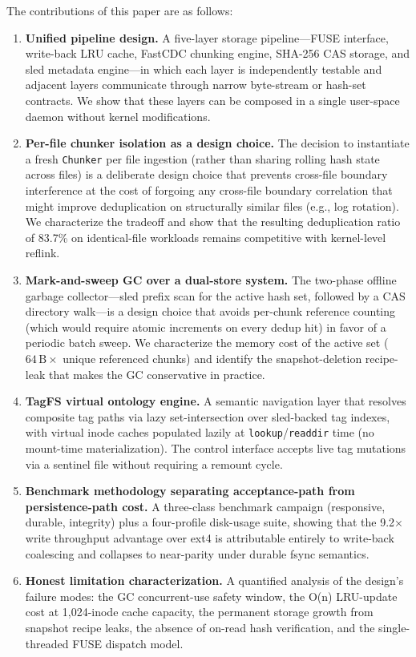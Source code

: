 \documentclass[5p,times]{elsarticle}
\begin{document}
The contributions of this paper are as follows:
\begin{enumerate}
\item \textbf{Unified pipeline design.} A five-layer storage pipeline---FUSE
  interface, write-back LRU cache, FastCDC chunking engine, SHA-256 CAS
  storage, and sled metadata engine---in which each layer is independently
  testable and adjacent layers communicate through narrow byte-stream or
  hash-set contracts.  We show that these layers can be composed in a
  single user-space daemon without kernel modifications.

\item \textbf{Per-file chunker isolation as a design choice.} The
  decision to instantiate a fresh \texttt{Chunker} per file ingestion
  (rather than sharing rolling hash state across files) is a deliberate
  design choice that prevents cross-file boundary interference at the cost
  of forgoing any cross-file boundary correlation that might improve
  deduplication on structurally similar files (e.g., log rotation).
  We characterize the tradeoff and show that the resulting deduplication
  ratio of 83.7\% on identical-file workloads remains competitive with
  kernel-level reflink.

\item \textbf{Mark-and-sweep GC over a dual-store system.} The two-phase
  offline garbage collector---sled prefix scan for the active hash set,
  followed by a CAS directory walk---is a design choice that avoids
  per-chunk reference counting (which would require atomic increments on
  every dedup hit) in favor of a periodic batch sweep.  We characterize
  the memory cost of the active set ($64\,\mathrm{B} \times$ unique
  referenced chunks) and identify the snapshot-deletion recipe-leak that
  makes the GC conservative in practice.

\item \textbf{TagFS virtual ontology engine.} A semantic navigation layer
  that resolves composite tag paths via lazy set-intersection over
  sled-backed tag indexes, with virtual inode caches populated lazily at
  \texttt{lookup}/\texttt{readdir} time (no mount-time materialization).
  The control interface accepts live tag mutations via a sentinel file
  without requiring a remount cycle.

\item \textbf{Benchmark methodology separating acceptance-path from
  persistence-path cost.} A three-class benchmark campaign (responsive,
  durable, integrity) plus a four-profile disk-usage suite, showing that
  the 9.2$\times$ write throughput advantage over ext4 is attributable
  entirely to write-back coalescing and collapses to near-parity under
  durable fsync semantics.

\item \textbf{Honest limitation characterization.} A quantified analysis
  of the design's failure modes: the GC concurrent-use safety window,
  the O(n) LRU-update cost at 1,024-inode cache capacity, the
  permanent storage growth from snapshot recipe leaks, the absence of
  on-read hash verification, and the single-threaded FUSE dispatch model.
\end{enumerate}
\end{document}
